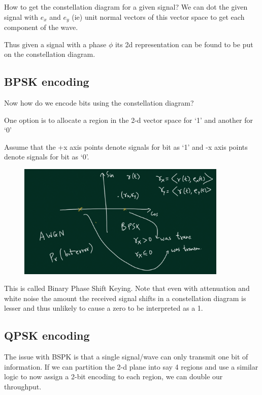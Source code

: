 \documentclass[12pt]{article}
\newcommand{\tbox}[1]{\noindent\fbox{\parbox{\textwidth}{#1}}}
\begin{document}
How to get the constellation diagram for a given signal? We can dot the given signal with \(e_x\) and \(e_y\) (ie)
unit normal vectors of this vector space to get each component of the wave. 

Thus given a signal with a phase \(\phi\) its 2d representation can be found to be put on the 
constellation diagram.  

\subsection{BPSK encoding}

Now how do we encode bits using the constellation diagram?

One option is to allocate a region in the 2-d vector space for `1' and another for `0'

Assume that the +x axis points denote signals for bit as `1' and -x axis points denote signals for bit as `0'.
\begin{figure}[H]
    \centering
    \includegraphics[width = 10cm]{Diagrams/BPSK.png}
\end{figure}

This is called Binary Phase Shift Keying. Note that even with attenuation and 
white noise the amount the received signal shifts in a constellation diagram 
is lesser and thus unlikely to cause a zero to be interpreted as a 1. 


\noindent\tbox{
    \begin{center}
    \textbf{\Huge Lecture 9}
    \end{center}
}
\subsection{QPSK encoding}

The issue with BSPK is that a single signal/wave can only transmit one bit of information.
If we can partition the 2-d plane into say 4 regions and use a similar logic to now assign a 2-bit encoding 
to each region, we can double our throughput. 
\end{document}
